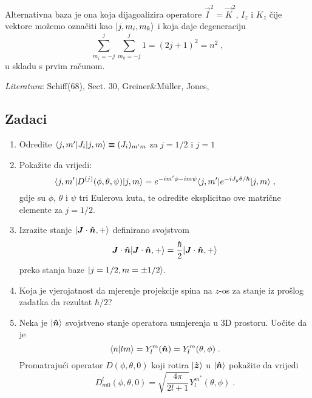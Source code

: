 Alternativna baza je ona koja dijagoalizira operatore
$\vec{I}^2=\vec{K}^2$, $I_z$ i $K_z$ čije vektore možemo
označiti kao $| j,m_i, m_k \rangle$ i koja daje degeneraciju
\begin{equation}
    \sum_{m_i=-j}^{j}\sum_{m_k=-j}^{j} 1 = (2j+1)^2 = n^2 \;,
\end{equation}
u skladu s prvim računom.

\emph{Literatura}: Schiff(68), Sect. 30, Greiner\&M\"{u}ller, Jones,

\subsection*{Zadaci}

\begin{enumerate}[{6}.1]

\item
Odredite $\langle j, m' |J_{i} | j, m \rangle \equiv (J_i)_{m' m}$ za 
$j=1/2$ i $j=1$

\item
Pokažite da vrijedi: 
\begin{equation}
\langle j, m' | D^{(j)}(\phi, \theta, \psi) | j, m \rangle = e^{-im'\phi-im\psi}
\langle j, m' | e^{-i J_y \theta /\hbar} | j, m \rangle \;,
\end{equation}
gdje su $\phi$, $\theta$ i $\psi$ tri Eulerova kuta,
te odredite eksplicitno ove matrične elemente za $j=1/2$.

\item
Izrazite stanje $\ket{\vec{J}\cdot\unitn, +}$ definirano svojstvom
\begin{displaymath}
    \vec{J}\cdot\unitn \ket{\vec{J}\cdot\unitn, +} =
  \frac{\hbar}{2} \ket{\vec{J}\cdot\unitn, +}
\end{displaymath}
preko stanja baze $| j=1/2, m=\pm 1/2 \rangle$.

\item
Koja je vjerojatnost da mjerenje projekcije spina na $z$-os za stanje iz
prošlog zadatka da rezultat $\hbar/2$?

\item 
Neka je $\ket{\unitn}$ svojstveno stanje operatora usmjerenja u 3D
prostoru. Uočite da je
\begin{displaymath}
     \bra{n}lm\rangle = Y^{m}_l (\unitn) = Y^{m}_l (\theta, \phi) \;.
\end{displaymath}
Promatrajući operator $D(\phi,\theta,0)$ koji rotira $\ket{\hat{\vec{z}}}$
u $\ket{\unitn}$ pokažite da vrijedi
\begin{displaymath}
    D^{l}_{m0}(\phi,\theta,0)=\sqrt{\frac{4\pi}{2l+1}}
 Y^{m^*}_l (\theta, \phi)\;.
\end{displaymath}


\end{enumerate}
